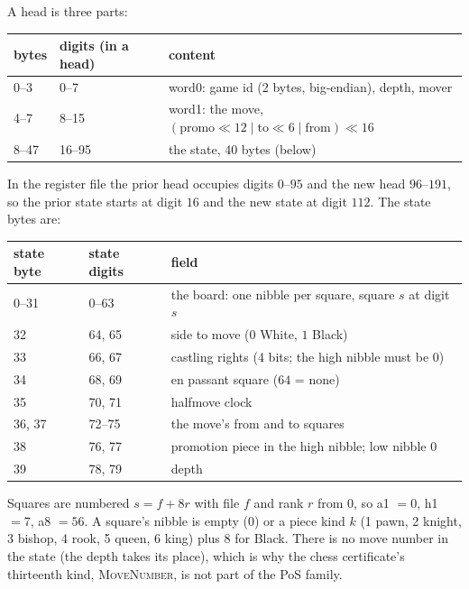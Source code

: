 \documentclass[11pt]{article}
\begin{document}
A head is three parts:
\begin{center}
\begin{tabular}{@{}lll@{}}
\toprule
bytes & digits (in a head) & content \\
\midrule
0--3 & 0--7 & word0: game id (2 bytes, big-endian), depth, mover \\
4--7 & 8--15 & word1: the move, $(\text{promo} \ll 12 \mid \text{to} \ll 6 \mid \text{from}) \ll 16$ \\
8--47 & 16--95 & the state, 40 bytes (below) \\
\bottomrule
\end{tabular}
\end{center}
In the register file the prior head occupies digits $0$--$95$ and the
new head $96$--$191$, so the prior state starts at digit $16$ and the
new state at digit $112$. The state bytes are:
\begin{center}
\begin{tabular}{@{}lll@{}}
\toprule
state byte & state digits & field \\
\midrule
0--31 & 0--63 & the board: one nibble per square, square $s$ at digit $s$ \\
32 & 64, 65 & side to move ($0$ White, $1$ Black) \\
33 & 66, 67 & castling rights (4 bits; the high nibble must be $0$) \\
34 & 68, 69 & en passant square ($64$ = none) \\
35 & 70, 71 & halfmove clock \\
36, 37 & 72--75 & the move's from and to squares \\
38 & 76, 77 & promotion piece in the high nibble; low nibble $0$ \\
39 & 78, 79 & depth \\
\bottomrule
\end{tabular}
\end{center}
Squares are numbered $s = f + 8r$ with file $f$ and rank $r$ from $0$,
so a1 $= 0$, h1 $= 7$, a8 $= 56$. A square's nibble is empty ($0$) or
a piece kind $k$ (1 pawn, 2 knight, 3 bishop, 4 rook, 5 queen, 6 king)
plus $8$ for Black. There is no move number in the state (the depth
takes its place), which is why the chess certificate's thirteenth kind,
\textsc{MoveNumber}, is not part of the PoS family.
\end{document}
